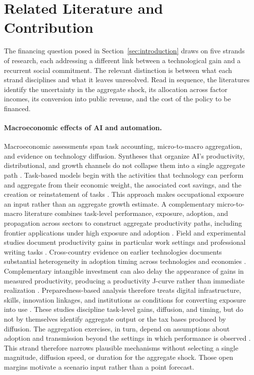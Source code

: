 \section{Related Literature and Contribution}\label{sec:literature}

The financing question posed in Section~\ref{sec:introduction} draws on five strands of research, each addressing a different link between a technological gain and a recurrent social commitment. The relevant distinction is between what each strand disciplines and what it leaves unresolved. Read in sequence, the literatures identify the uncertainty in the aggregate shock, its allocation across factor incomes, its conversion into public revenue, and the cost of the policy to be financed.

\paragraph{Macroeconomic effects of AI and automation.}
Macroeconomic assessments span task accounting, micro-to-macro aggregation, and evidence on technology diffusion. Syntheses that organize AI's productivity, distributional, and growth channels do not collapse them into a single aggregate path \citep{oecd2024impactai}. Task-based models begin with the activities that technology can perform and aggregate from their economic weight, the associated cost savings, and the creation or reinstatement of tasks \citep{acemoglu2018race,acemoglu2019automation,acemoglu2024simple}. This approach makes occupational exposure an input rather than an aggregate growth estimate. A complementary micro-to-macro literature combines task-level performance, exposure, adoption, and propagation across sectors to construct aggregate productivity paths, including frontier applications under high exposure and adoption \citep{filippucci2024miracle,oecd2025g7}. Field and experimental studies document productivity gains in particular work settings and professional writing tasks \citep{brynjolfsson2023generative,noy2023experimental}. Cross-country evidence on earlier technologies documents substantial heterogeneity in adoption timing across technologies and economies \citep{comin2010diffusion}. Complementary intangible investment can also delay the appearance of gains in measured productivity, producing a productivity J-curve rather than immediate realization \citep{brynjolfsson2021jcurve}. Preparedness-based analysis therefore treats digital infrastructure, skills, innovation linkages, and institutions as conditions for converting exposure into use \citep{cazzaniga2024genai}. These studies discipline task-level gains, diffusion, and timing, but do not by themselves identify aggregate output or the tax bases produced by diffusion. The aggregation exercises, in turn, depend on assumptions about adoption and transmission beyond the settings in which performance is observed \citep{acemoglu2024simple,filippucci2024miracle}. This strand therefore narrows plausible mechanisms without selecting a single magnitude, diffusion speed, or duration for the aggregate shock. Those open margins motivate a scenario input rather than a point forecast.

